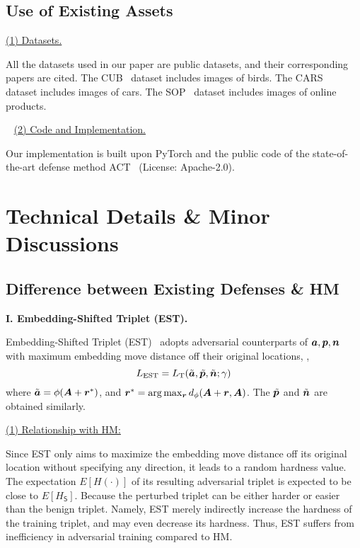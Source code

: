 
\subsection{Use of Existing Assets}

\noindent\ul{(1) Datasets.}

All the datasets used in our paper are public datasets,
and their corresponding papers are cited.
%
The CUB~\cite{cub200} dataset includes images of birds.
%
The CARS~\cite{cars196} dataset includes images of cars.
%
The SOP~\cite{sop} dataset includes images of online products.

~\newline
\noindent\ul{(2) Code and Implementation.}

Our implementation is built upon PyTorch
and the public code of the state-of-the-art defense method ACT~\cite{robrank}
(License: Apache-2.0).

\section{Technical Details \& Minor Discussions}
\label{sec:b}

\subsection{Difference between Existing Defenses \& HM}
\label{sec:b1}

\noindent\textbf{I. Embedding-Shifted Triplet (EST).}~\cite{advrank}

Embedding-Shifted Triplet (EST)~\cite{advrank} adopts adversarial counterparts
of ${\bm{a}},{\bm{p}},{\bm{n}}$ with maximum embedding move distance off their original
locations, \ie,
%
\begin{equation}
%
L_\text{EST}=L_\text{T}(\tilde{\va},\tilde{\vp},\tilde{\vn};\gamma)
%
\end{equation}
%
where
$\tilde{{\bm{a}}}=\phi({\bm{A}}+{\bm{r}}^*)$, and ${\bm{r}}^*=\arg\max_{{\bm{r}}}d_\phi({\bm{A}}+{\bm{r}}, {\bm{A}})$.
%
The $\tilde{{\bm{p}}}$ and $\tilde{{\bm{n}}}$ are obtained similarly.

\ul{(1) Relationship with HM:}

Since EST only aims to maximize the embedding move distance off its original
location without specifying any direction, it leads to a random hardness value.
%
The expectation $E[H(\cdot)]$ of its resulting adversarial triplet is expected
to be close to $E[H_\mathsf{S}]$.
%
Because the perturbed triplet can be either harder or easier than the benign
triplet.
%
Namely, EST merely indirectly increase the hardness of the training triplet,
and may even decrease its hardness.
%
Thus, EST suffers from inefficiency in adversarial training compared to HM.

